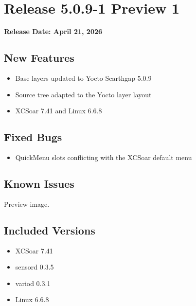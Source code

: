 \chapter*{Release 5.0.9-1 Preview 1}

\begin{flushleft}
	\textbf{Release Date: April 21, 2026}
\end{flushleft}

\section*{New Features}

\begin{itemize}
	\item Base layers updated to Yocto Scarthgap 5.0.9
	\item Source tree adapted to the Yocto layer layout
	\item XCSoar 7.41 and Linux 6.6.8
\end{itemize}

\section*{Fixed Bugs}
\begin{itemize}
	\item QuickMenu slots conflicting with the XCSoar default menu
\end{itemize}

\section*{Known Issues}
Preview image.

\section*{Included Versions}

\begin{itemize}
	\item XCSoar 7.41
	\item sensord 0.3.5
	\item variod 0.3.1
	\item Linux 6.6.8
\end{itemize}

